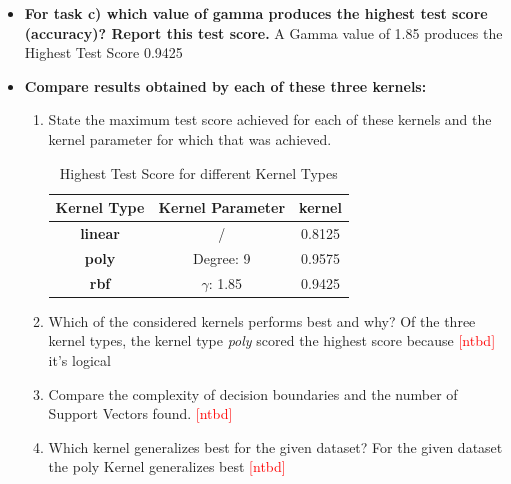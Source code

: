 \documentclass[a4paper]{article}
\begin{document}
\begin{enumerate}[label=(\alph*)]
\begin{itemize}
\item \textbf{For task c) which value of gamma produces the highest test score (accuracy)? Report this test score.} \newline
A Gamma value of 1.85 produces the Highest Test Score 0.9425

\item \textbf{Compare results obtained by each of these three kernels:}
\begin{enumerate}
\item State the maximum test score achieved for each of these kernels and the kernel parameter for which that was achieved.
\begin{table}[htp]
\centering
\label{max_test_score}
\begin{tabular}{|c|c|c|}
\hline
\textbf{Kernel Type} & \multicolumn{1}{l|}{\textbf{Kernel Parameter}} & \textbf{kernel} \\ \hline
\textbf{linear}      & /                                              & 0.8125          \\ \hline
\textbf{poly}  & Degree: 9                                      & 0.9575          \\ \hline
\textbf{rbf}         & $\gamma$: 1.85                    & 0.9425          \\ \hline
\end{tabular}
\caption{Highest Test Score for different Kernel Types}
\end{table}
\item Which of the considered kernels performs best and why?\newline
Of the three kernel types, the kernel type \textit{poly} scored the highest score because \textcolor{red}{[ntbd]} it's logical 
\item Compare the complexity of decision boundaries and the number of Support Vectors found.\newline
 \textcolor{red}{[ntbd]}
\item Which kernel generalizes best for the given dataset?\newline
For the given dataset the poly Kernel generalizes best
\textcolor{red}{[ntbd]}
\end{enumerate}
\end{itemize}

\end{enumerate}

\newpage
\end{document}
